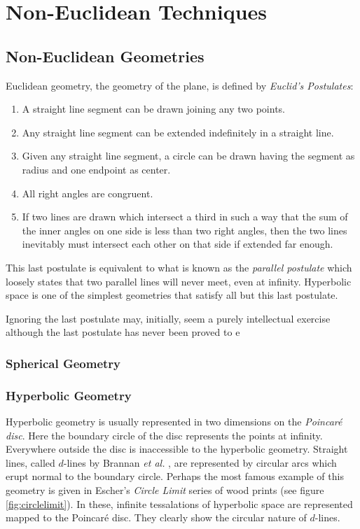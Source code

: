 \chapter{Non-Euclidean Techniques}

\section{Non-Euclidean Geometries}


Euclidean geometry, the geometry of the plane, is defined by \emph{Euclid's Postulates}:

\begin{enumerate}
\item A straight line segment can be drawn joining any two points. 
\item Any straight line segment can be extended indefinitely in a straight line. 
\item Given any straight line segment, a circle can be drawn having the segment as radius and one endpoint as center. 
\item All right angles are congruent. 
\item If two lines are drawn which intersect a third in such a way that the sum of the inner angles on one side is less than two right angles, then the two lines inevitably must intersect each other on that side if extended far enough.
\end{enumerate} 

This last postulate is equivalent to what is known as the \emph{parallel postulate}
which loosely states that two parallel lines will never meet, even at infinity.
Hyperbolic space is one of the simplest geometries that satisfy all but this
last postulate.

Ignoring the last postulate may, initially, seem a purely intellectual exercise
although the last postulate has never been proved to e

\subsection{Spherical Geometry}
\subsection{Hyperbolic Geometry}


Hyperbolic geometry is usually represented in two dimensions on the
\emph{Poincar\'e disc}. Here the boundary circle of the disc represents
the points at infinity. Everywhere outside the disc is inaccessible to
the hyperbolic geometry. Straight lines, called $d$-lines by Brannan
\emph{et al.} \cite{GEOM:brannan}, are represented by circular arcs which erupt 
normal to the boundary circle. Perhaps the most famous example of this
geometry is given in Escher's \emph{Circle Limit} series of wood
prints (see figure \ref{fig:circlelimit}). In these, infinite tessalations
of hyperbolic space are represented mapped to the Poincar\'e disc. They
clearly show the circular nature of $d$-lines.

